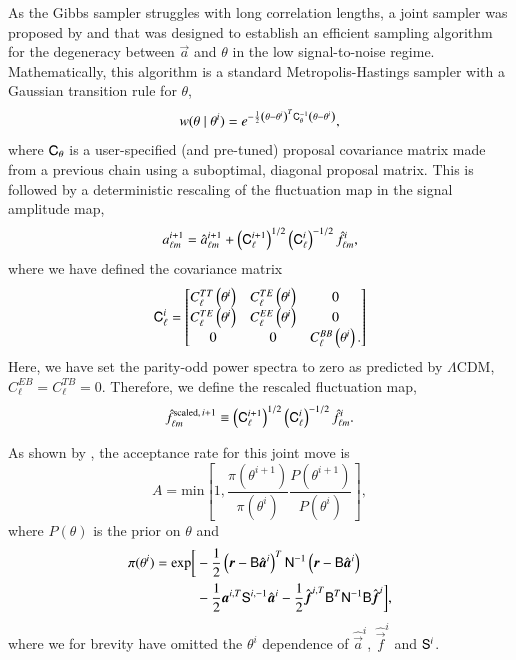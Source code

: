 \documentclass[twocolumn]{aa}
\newcommand{\B}[0]{\tens{B}}
\renewcommand{\a}[0]{\vec{a}}
\newcommand{\f}[0]{\vec{f}}
\newcommand{\N}[0]{\tens{N}}
\renewcommand{\S}[0]{\tens{S}}
\renewcommand{\r}[0]{\vec{r}}
\begin{document}
As the Gibbs sampler struggles with long correlation lengths, a joint sampler was proposed by \citet{jewell:2009} and \citet{racine:2016} that was designed to establish an efficient sampling algorithm for the degeneracy between $\a$ and $\theta$ in the low signal-to-noise regime. Mathematically, this algorithm is a standard Metropolis-Hastings sampler with a Gaussian transition rule for $\theta$,
\begin{equation}
w(\theta \mid\theta^i) = e^{-\frac12 \left(\theta - \theta^i \right)^T \mathsf{C}_{\theta}^{-1}\left(\theta - \theta^i \right)},
\end{equation}
where $\mathsf{C}_{\theta}$ is a user-specified (and pre-tuned) proposal covariance matrix made from a previous chain using a suboptimal, diagonal proposal matrix. This is followed by a deterministic rescaling of the fluctuation map in the signal amplitude map,
\begin{equation}
    a_{\ell m}^{i+1} = \hat{a}_{\ell m}^{i+1} + \left(\mathsf{C}^{i+1}_{\ell}\right)^{1/2}\left(\mathsf{C}^{i}_{\ell}\right)^{-1/2} \hat{f}_{\ell m}^{i},
\end{equation}
where we have defined the covariance matrix
\begin{equation}
  \mathsf{C}^i_\ell = \begin{bmatrix}
    C^{TT}_{\ell}\left(\theta^i\right) & C^{TE}_\ell\left(\theta^i\right) & 0\\
    C^{TE}_{\ell}\left(\theta^i\right) & C^{EE}_\ell\left(\theta^i\right) & 0\\
    0 & 0 & C^{BB}_\ell\left(\theta^i\right).
  \end{bmatrix}
\end{equation}
Here, we have set the parity-odd power spectra to zero as predicted by $\Lambda$CDM, $C^{EB}_\ell = C^{TB}_\ell = 0$. Therefore, we define the rescaled fluctuation map,
\begin{equation}
  \hat{f}_{\ell m}^{\textrm{scaled},\, i+1} \equiv \left(\mathsf{C}^{i+1}_{\ell}\right)^{1/2}\left(\mathsf{C}^{i}_{\ell}\right)^{-1/2} \hat{f}_{\ell m}^{i}.
\end{equation}

As shown by \citet{racine:2016}, the acceptance rate for this joint move is
\begin{equation}
    \label{eq:acceptance-rate}
    A = \mathrm{min}\left[1, \frac{\pi(\theta^{i+1})}{\pi(\theta^i)} \frac{P(\theta^{i+1})}{P(\theta^i)} \right],
\end{equation}
where $P(\theta)$ is the prior on $\theta$ and
\begin{align}
    \nonumber
    \pi(\theta^{i}) = \mathrm{exp}\bigg[&-\frac12 \left(\r-\B\hat{\a}^i\right)^T \N^{-1}\left(\r-\B\hat{\a}^i\right)\\
    &-\frac12\a^{i,T} \S^{i, -1}\hat{\a}^i -\frac12 \hat{\f}^{i, T}\B^T\N^{-1} \B\hat{\f}^i\bigg],
\end{align}
where we for brevity have omitted the $\theta^i$ dependence of $\hat{\a}^i$, $\hat{\f}^i$ and $\S^i$. 
\end{document}
